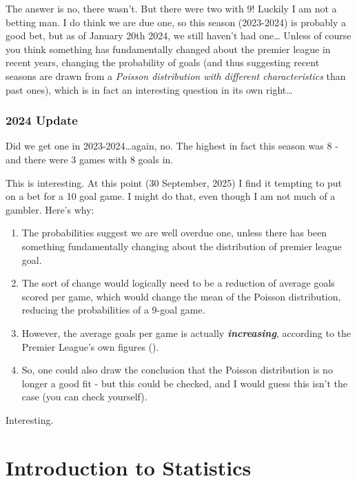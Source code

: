 \documentclass[
]{book}
\begin{document}
The answer is no, there wasn't. But there were two with 9! Luckily I am not a betting man. I do think we are due one, so this season (2023-2024) is probably a good bet, but as of January 20th 2024, we still haven't had one\ldots{} Unless of course you think something has fundamentally changed about the premier league in recent years, changing the probability of goals (and thus suggesting recent seasons are drawn from a \emph{Poisson distribution with different characteristics} than past ones), which is in fact an interesting question in its own right\ldots{}

\subsection{2024 Update}\label{update-1}

Did we get one in 2023-2024\ldots again, no. The highest in fact this season was 8 - and there were 3 games with 8 goals in.

This is interesting. At this point (30 September, 2025) I find it tempting to put on a bet for a 10 goal game. I might do that, even though I am not much of a gambler. Here's why:

\begin{enumerate}
\def\labelenumi{\arabic{enumi}.}
\item
  The probabilities suggest we are well overdue one, unless there has been something fundamentally changing about the distribution of premier league goal.
\item
  The sort of change would logically need to be a reduction of average goals scored per game, which would change the mean of the Poisson distribution, reducing the probabilities of a 9-goal game.
\item
  However, the average goals per game is actually \textbf{\emph{increasing}}, according to the Premier League's own figures ().
\item
  So, one could also draw the conclusion that the Poisson distribution is no longer a good fit - but this could be checked, and I would guess this isn't the case (you can check yourself).
\end{enumerate}

Interesting.

\chapter{Introduction to Statistics}\label{statistics}
\end{document}
